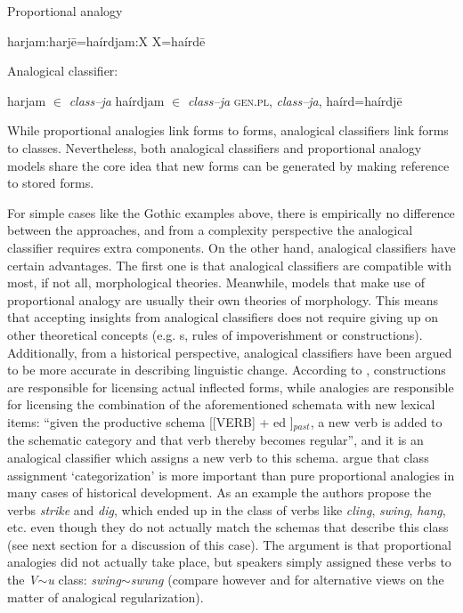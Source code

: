 \begin{exe}
    \ex \label{exe-proportional-schema} Proportional analogy
    \begin{xlist}
        \ex harjam:harjē=haírdjam:X
        \ex X=haírdē
    \end{xlist}

    \ex \label{exe-classifier-schema} Analogical classifier:
    \begin{xlist}
        \ex harjam $\in$ \textit{class--ja}
        \ex haírdjam $\in$ \textit{class--ja}
        \ex \textsc{gen.pl}, \textit{class--ja}, haírd=haírdjē
    \end{xlist}
\end{exe}


While proportional analogies link forms to forms, analogical classifiers link forms to classes. Nevertheless, both analogical classifiers and proportional analogy models share the core idea that new forms can be generated by making reference to stored forms.

For simple cases like the Gothic examples above, there is empirically no difference between the approaches, and from a complexity perspective the analogical classifier requires extra components. On the other hand, analogical classifiers have certain advantages. The first one is that analogical classifiers are compatible with most, if not all, morphological theories. Meanwhile, models that make use of proportional analogy are usually their own theories of morphology. This means that accepting insights from analogical classifiers does not require giving up on other theoretical concepts (e.g. s, rules of impoverishment or constructions). Additionally, from a historical perspective, analogical classifiers have been argued to be more accurate in describing linguistic change. According to \textcite[506]{Bybee.2015}, constructions are responsible for licensing actual inflected forms, while analogies are responsible for licensing the combination of the aforementioned schemata with new lexical items: ``given the productive schema [[VERB] + ed ]$_{past}$, a new verb is added to the schematic category and that verb thereby becomes regular'', and it is an analogical classifier which assigns a new verb to this schema. \textcite{Bybee.2015} argue that class assignment `categorization' is more important than pure proportional analogies in many cases of historical development. As an example the authors propose the verbs \textit{strike} and \textit{dig}, which ended up in the class of verbs like \textit{cling}, \textit{swing}, \textit{hang}, etc. even though they do not actually match the schemas that describe this class (see next section for a discussion of this case). The argument is that proportional analogies did not actually take place, but speakers simply assigned these verbs to the \textit{V$\sim$u} class: \textit{swing}$\sim$\textit{swung} (compare however \textcite{DeSmet.2016} and \textcite{Fertig.2013} for alternative views on the matter of analogical regularization).

